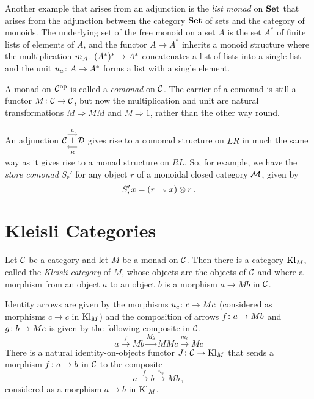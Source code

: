 \begin{example}
  Another example that arises from an adjunction is the \emph{list monad} on $\Set$ that arises from the adjunction between the category $\Set$ of sets and the category of monoids.
  The underlying set of the free monoid on a set $A$ is the set $A^*$ of finite lists of elements of $A$, and the functor $A\mapsto A^*$ inherits a monoid structure where the multiplication $m_A\from (A^*)^* \to A^*$ concatenates a list of lists into a single list and the unit $u_a \from A \to A^*$ forms a list with a single element.  
\end{example}
\begin{example}
  A monad on $\oppcat\C$ is called a \emph{comonad} on $\C$.  
  The carrier of a comonad is still a functor $M\from \C\to\C$, but now the multiplication and unit are natural transformations $M\Rightarrow MM$ and $M\Rightarrow 1$, rather than the other way round.  

  An adjunction $\adjunction\C LR\D$ gives rise to a comonad structure on $LR$ in much the same way as it gives rise to a monad structure on $RL$.  
  So, for example, we have the \emph{store comonad} $S_r'$ for any object $r$ of a monoidal closed category $\M$, given by
  \[
    S_r'x = (r \implies x) \tensor r\,.
    \]
\end{example}

\section{Kleisli Categories}

Let $\C$ be a category and let $M$ be a monad on $\C$.  
Then \cite{Kleisli} there is a category $\Kl_M$, called the \emph{Kleisli category} of $M$, whose objects are the objects of $\C$ and where a morphism from an object $a$ to an object $b$ is a morphism $a \to Mb$ in $\C$.

Identity arrows are given by the morphisms $u_c\from c \to M c$ (considered as morphisms $c\to c$ in $\Kl_M$) and the composition of arrows $f\from a \to Mb$ and $g \from b \to Mc$ is given by the following composite in $\C$.
\[
  a \xrightarrow{f}
  Mb \xrightarrow{Mg}
  MMc \xrightarrow{m_c}
  M c
  \]
There is a natural identity-on-objects functor $J\from \C \to \Kl_M$ that sends a morphism $f\from a \to b$ in $\C$ to the composite
\[
  a \xrightarrow{f}
  b \xrightarrow{u_b}
  M b\,,
  \]
considered as a morphism $a\to b$ in $\Kl_M$.

